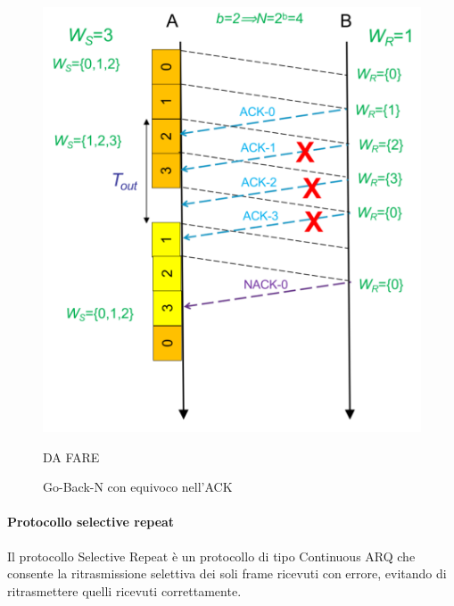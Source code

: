 \begin{figure}[htbp]
    \centering
     \begin{minipage}{0.46\textwidth}
        \includegraphics[width=\linewidth]{images/ackequivoco2.png}
        \caption{Go-Back-N con equivoco nell'ACK}

    \end{minipage}
    \hfill
    \begin{minipage}{0.5\textwidth}
        DA FARE
    \end{minipage}%
\end{figure}
\newpage

\paragraph{Protocollo selective repeat} 
Il protocollo Selective Repeat è un protocollo di tipo Continuous ARQ che consente la ritrasmissione selettiva dei soli frame ricevuti con errore, evitando di ritrasmettere quelli ricevuti correttamente.


